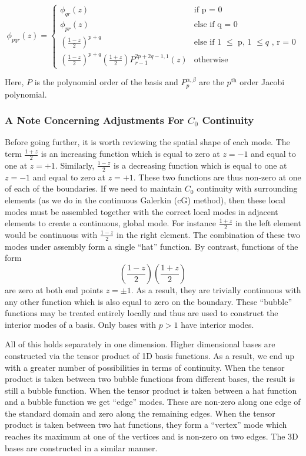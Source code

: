 
\[
    \phi_{pqr}(z) = \left\{
    \begin{array}{ll}
        \phi_{qr}(z) & \text{if p = 0}  \\
        \phi_{pr}(z) & \text{else if q = 0}  \\
        \left(\frac{1-z}{2}\right)^{p+q} & \text{else if 1 $\leq$ p, 1 $\leq q$ , r = 0} \\
        \left(\frac{1 - z}{2}\right)^{p + q} \left(\frac{1+z}{2}\right) P_{r-1}^{2p + 2q - 1, 1}(z) & \text{otherwise}
    \end{array}\right.
\]

Here, $P$ is the polynomial order of the basis and $P^{\alpha,\beta}_{p}$ are the $p^{\text{th}}$ order Jacobi polynomial.

\subsubsection{A Note Concerning Adjustments For $C_0$ Continuity}

Before going further, it is worth reviewing the spatial shape of each mode. The term $\frac{1 + z}{2}$ is an 
increasing function which is equal to zero at $z = -1$ and equal to one at $z = +1$. Similarly, $\frac{1 - z}{2}$ is a decreasing function which is equal to one at $z = -1$ and equal to zero at $z = +1$. These two functions are thus non-zero at one of each of the boundaries. 
If we need to maintain $C_0$ continuity with surrounding elements (as we do in the continuous Galerkin (cG) method), 
then these local modes must be assembled together with the correct local modes in adjacent elements to create a continuous, global mode. 
For instance $\frac{1 + z}{2}$ in the left element would be continuous with $\frac{1 - z}{2}$ in the right element. The combination of these 
two modes under assembly form a single ``hat'' function. By contrast, functions of the form
\[
    \left(\frac{1 - z}{2} \right)\left(\frac{1 + z}{2}\right)
\]
are zero at both end points $z = \pm 1$. As a result, they are trivially continuous with any other function which is also equal to zero on the boundary. These ``bubble'' functions may be treated entirely locally and thus are used to construct the interior modes of a basis. Only bases with $p > 1$ have interior modes.

All of this holds separately in one dimension. Higher dimensional bases are constructed via the tensor product of 1D basis functions. As a result, we end up with a greater number of possibilities in terms of continuity. When the tensor product is taken between two bubble functions from different bases, the result is still a bubble function. When the tensor product is taken between a hat function and a bubble function we get ``edge'' modes. These are non-zero along one edge of the standard domain and zero along the remaining edges. When the tensor product is taken between two hat functions, they form a ``vertex'' mode which reaches its maximum at one of the vertices and is non-zero on two edges. The 3D bases are constructed in a similar manner.

